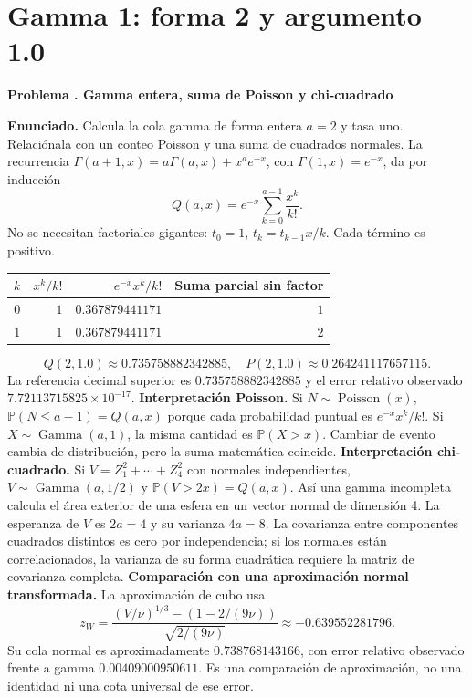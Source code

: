 \documentclass[11pt,a4paper]{article}
\newcommand{\Prob}{\mathbb P}
\theoremstyle{definition}
\newcounter{problema}
\newenvironment{resuelto}[1]{\refstepcounter{problema}\par\medskip\Needspace{6\baselineskip}\textbf{Problema \theproblema. #1}\par}{\par\medskip}
\begin{document}
\section{Gamma 1: forma 2 y argumento 1.0}
\begin{resuelto}{Gamma entera, suma de Poisson y chi-cuadrado}
\textbf{Enunciado.} Calcula la cola gamma de forma entera $a=2$ y tasa uno. Relaciónala con un conteo Poisson y una suma de cuadrados normales.
La recurrencia $\Gamma(a+1,x)=a\Gamma(a,x)+x^ae^{-x}$, con $\Gamma(1,x)=e^{-x}$, da por inducción
\[
Q(a,x)=e^{-x}\sum_{k=0}^{a-1}\frac{x^k}{k!}.
\]
No se necesitan factoriales gigantes: $t_0=1$, $t_k=t_{k-1}x/k$. Cada término es positivo.

\begin{center}\small\begin{tabular}{rrrr}
\toprule
$k$&$x^k/k!$&$e^{-x}x^k/k!$&Suma parcial sin factor\\
\midrule
0&$1$&$0.367879441171$&$1$\\
1&$1$&$0.367879441171$&$2$\\
\bottomrule\end{tabular}\end{center}
\[
Q(2,1.0)\approx0.735758882342885,\quad
P(2,1.0)\approx0.264241117657115.
\]
La referencia decimal superior es $0.735758882342885$ y el error relativo observado $7.72113715825\times10^{-17}$.
\textbf{Interpretación Poisson.} Si $N\sim\operatorname{Poisson}(x)$, $\Prob(N\le a-1)=Q(a,x)$ porque cada probabilidad puntual es $e^{-x}x^k/k!$. Si $X\sim\operatorname{Gamma}(a,1)$, la misma cantidad es $\Prob(X>x)$. Cambiar de evento cambia de distribución, pero la suma matemática coincide.
\textbf{Interpretación chi-cuadrado.} Si $V=Z_1^2+\cdots+Z_{4}^2$ con normales independientes, $V\sim\operatorname{Gamma}(a,1/2)$ y $\Prob(V>2x)=Q(a,x)$. Así una gamma incompleta calcula el área exterior de una esfera en un vector normal de dimensión 4.
La esperanza de $V$ es $2a=4$ y su varianza $4a=8$. La covarianza entre componentes cuadrados distintos es cero por independencia; si los normales están correlacionados, la varianza de su forma cuadrática requiere la matriz de covarianza completa.
\textbf{Comparación con una aproximación normal transformada.} La aproximación de cubo usa
\[
z_W=\frac{(V/\nu)^{1/3}-(1-2/(9\nu))}{\sqrt{2/(9\nu)}}\approx-0.639552281796.
\]
Su cola normal es aproximadamente $0.738768143166$, con error relativo observado frente a gamma $0.00409000950611$. Es una comparación de aproximación, no una identidad ni una cota universal de ese error.
\end{resuelto}
\end{document}
